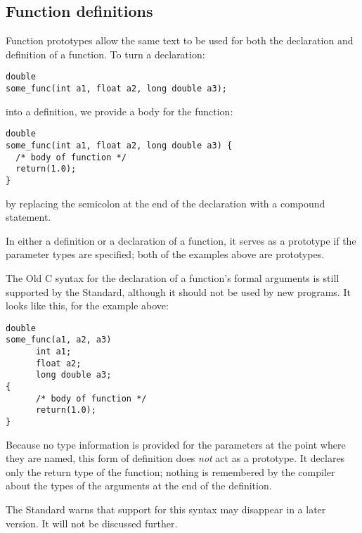   

  \subsection{Function definitions}
   

   Function prototypes allow the same text to be used for both the
    declaration and definition of a function. To turn a declaration:

\begin{Verbatim}
double
some_func(int a1, float a2, long double a3);
\end{Verbatim}

   into a definition, we provide a body for the function:

\begin{Verbatim}
double
some_func(int a1, float a2, long double a3) {
  /* body of function */
  return(1.0);
}
\end{Verbatim}

   by replacing the semicolon at the end of the declaration with a
    compound statement.


   In either a definition or a declaration of a function, it serves as a
    prototype if the parameter types are specified; both of the examples
    above are prototypes.


   The Old C syntax for the declaration of a function's formal arguments
    is still supported by the Standard, although it should not be used by
    new programs. It looks like this, for the example above:

\begin{Verbatim}
double
some_func(a1, a2, a3)
      int a1;
      float a2;
      long double a3;
{
      /* body of function */
      return(1.0);
}
\end{Verbatim}

   Because no type information is provided for the parameters at the
    point where they are named, this form of definition does \textit{not}
    act as a prototype. It declares only the return type of the function;
    nothing is remembered by the compiler about the types of the arguments
    at the end of the definition.


   The Standard warns that support for this syntax may disappear in a
    later version. It will not be discussed further.



